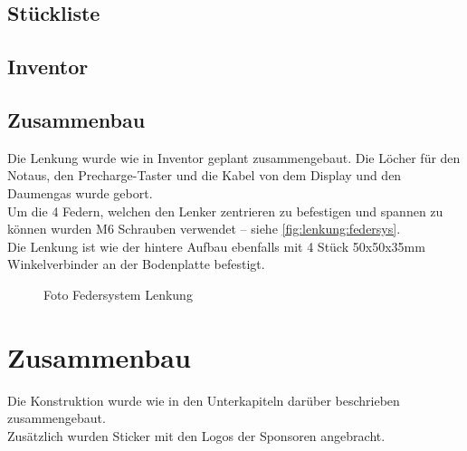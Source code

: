 \clearpage
\subsection{Stückliste}


\clearpage
\subsection{Inventor}

\cleardoublepage
\subsection{Zusammenbau}
Die Lenkung wurde wie in Inventor geplant zusammengebaut. Die Löcher für den Notaus, den Precharge-Taster und die Kabel von dem Display und den Daumengas wurde gebort.\\
Um die 4 Federn, welchen den Lenker zentrieren zu befestigen und spannen zu können wurden M6 Schrauben verwendet -- siehe \autoref{fig:lenkung:federsys}.\\
Die Lenkung ist wie der hintere Aufbau ebenfalls mit 4 Stück 50x50x35mm Winkelverbinder an der Bodenplatte befestigt.

\begin{figure}[H]
    \caption{Foto Federsystem Lenkung \label{fig:lenkung:federsys}}
\end{figure}

\section{Zusammenbau}
Die Konstruktion wurde wie in den Unterkapiteln darüber beschrieben zusammengebaut.\\
Zusätzlich wurden Sticker mit den Logos der Sponsoren angebracht.
